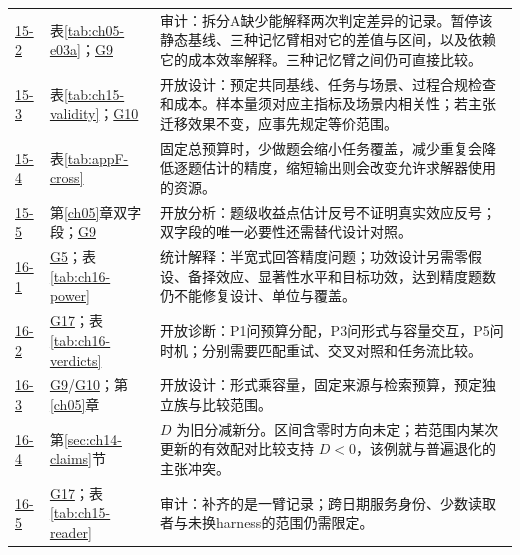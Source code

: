 \begin{small}
\begin{longtable}{@{}p{1.1cm}p{4.1cm}p{10.1cm}@{}}
\hyperref[ex:ch15-2]{15-2} & 表\ref{tab:ch05-e03a}；\hyperref[sol:g09]{G9} & 审计：拆分A缺少能解释两次判定差异的记录。暂停该静态基线、三种记忆臂相对它的差值与区间，以及依赖它的成本效率解释。三种记忆臂之间仍可直接比较。 \\
\hyperref[ex:ch15-3]{15-3} & 表\ref{tab:ch15-validity}；\hyperref[sol:g10]{G10} & 开放设计：预定共同基线、任务与场景、过程合规检查和成本。样本量须对应主指标及场景内相关性；若主张迁移效果不变，应事先规定等价范围。 \\
\hyperref[ex:ch15-4]{15-4} & 表\ref{tab:appF-cross} & 固定总预算时，少做题会缩小任务覆盖，减少重复会降低逐题估计的精度，缩短输出则会改变允许求解器使用的资源。 \\
\hyperref[ex:ch15-5]{15-5} & 第\ref{ch05}章双字段；\hyperref[sol:g09]{G9} & 开放分析：题级收益点估计反号不证明真实效应反号；双字段的唯一必要性还需替代设计对照。 \\
\hyperref[ex:ch16-1]{16-1} & \hyperref[sol:g05]{G5}；表\ref{tab:ch16-power} & 统计解释：半宽式回答精度问题；功效设计另需零假设、备择效应、显著性水平和目标功效，达到精度题数仍不能修复设计、单位与覆盖。 \\
\hyperref[ex:ch16-2]{16-2} & \hyperref[sol:g17]{G17}；表\ref{tab:ch16-verdicts} & 开放诊断：P1问预算分配，P3问形式与容量交互，P5问时机；分别需要匹配重试、交叉对照和任务流比较。 \\
\hyperref[ex:ch16-3]{16-3} & \hyperref[sol:g09]{G9}/\hyperref[sol:g10]{G10}；第\ref{ch05}章 & 开放设计：形式乘容量，固定来源与检索预算，预定独立族与比较范围。 \\
\hyperref[ex:ch16-4]{16-4} & 第\ref{sec:ch14-claims}节 & $D$ 为旧分减新分。区间含零时方向未定；若范围内某次更新的有效配对比较支持 $D<0$，该例就与普遍退化的主张冲突。 \\
\hyperref[ex:ch16-5]{16-5} & \hyperref[sol:g17]{G17}；表\ref{tab:ch15-reader} & 审计：补齐的是一臂记录；跨日期服务身份、少数读取者与未换harness的范围仍需限定。 \\
\end{longtable}
\end{small}

